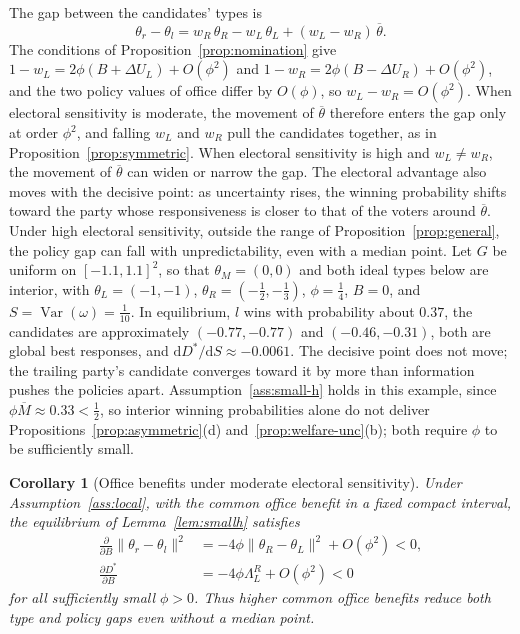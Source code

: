 \documentclass[12pt,letterpaper]{article}
\newtheorem{corollary}{Corollary}
\begin{document}
The gap between the candidates' types is
\begin{equation}\label{eq:typegap}
\theta_r-\theta_l=w_R\,\theta_R-w_L\,\theta_L+(w_L-w_R)\,\overline{\theta} .
\end{equation}
The conditions of Proposition~\ref{prop:nomination} give $1-w_L=2\phi(B+\Delta U_L)+O(\phi^2)$ and $1-w_R=2\phi(B-\Delta U_R)+O(\phi^2)$, and the two policy values of office differ by $O(\phi)$, so $w_L-w_R=O(\phi^2)$. When electoral sensitivity is moderate, the movement of $\overline{\theta}$ therefore enters the gap only at order $\phi^2$, and falling $w_L$ and $w_R$ pull the candidates together, as in Proposition~\ref{prop:symmetric}. When electoral sensitivity is high and $w_L\ne w_R$, the movement of $\overline{\theta}$ can widen or narrow the gap. The electoral advantage also moves with the decisive point: as uncertainty rises, the winning probability shifts toward the party whose responsiveness is closer to that of the voters around $\overline{\theta}$. Under high electoral sensitivity, outside the range of Proposition~\ref{prop:general}, the policy gap can fall with unpredictability, even with a median point. Let $G$ be uniform on $[-1.1,1.1]^2$, so that $\theta_M=(0,0)$ and both ideal types below are interior, with $\theta_L=(-1,-1)$, $\theta_R=(-\tfrac12,-\tfrac13)$, $\phi=\tfrac14$, $B=0$, and $S=\operatorname{Var}(\omega)=\tfrac1{10}$. In equilibrium, $l$ wins with probability about $0.37$, the candidates are approximately $(-0.77,-0.77)$ and $(-0.46,-0.31)$, both are global best responses, and $\mathrm{d}D^*/\mathrm{d}S\approx-0.0061$. The decisive point does not move; the trailing party's candidate converges toward it by more than information pushes the policies apart. Assumption~\ref{ass:small-h} holds in this example, since $\phi\overline{M}\approx0.33<\tfrac12$, so interior winning probabilities alone do not deliver Propositions~\ref{prop:asymmetric}(d) and~\ref{prop:welfare-unc}(b); both require $\phi$ to be sufficiently small.

\begin{corollary}[Office benefits under moderate electoral sensitivity]\label{cor:benefits}
Under Assumption~\ref{ass:local}, with the common office benefit in a fixed compact interval, the equilibrium of Lemma~\ref{lem:smallh} satisfies
\begin{align*}
\frac{\partial}{\partial B}\|\theta_r-\theta_l\|^2
&=-4\phi\|\theta_R-\theta_L\|^2+O(\phi^2)<0,\\
\frac{\partial D^*}{\partial B}
&=-4\phi\Lambda_L^R+O(\phi^2)<0
\end{align*}
for all sufficiently small $\phi>0$. Thus higher common office benefits reduce both type and policy gaps even without a median point.
\end{corollary}
\end{document}
